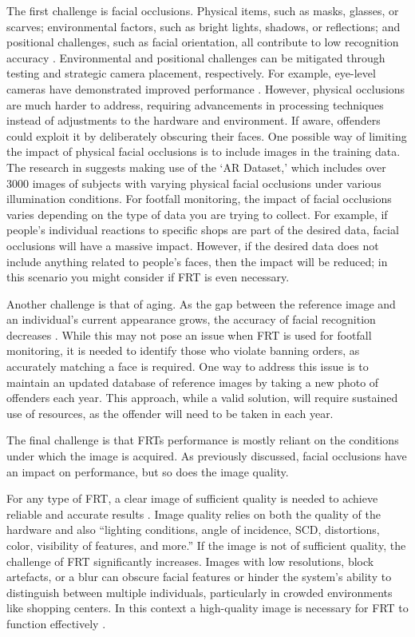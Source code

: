 \documentclass{article}
\begin{document}
The first challenge is facial occlusions. Physical items, such as masks, glasses, or scarves; environmental factors, such as bright lights, shadows, or reflections; and positional challenges, such as facial orientation, all contribute to low recognition accuracy \cite{PPFOfFRT}. Environmental and positional challenges can be mitigated through testing and strategic camera placement, respectively. For example, eye-level cameras have demonstrated improved performance \cite{Bacci2021}. However, physical occlusions are much harder to address, requiring advancements in processing techniques instead of adjustments to the hardware and environment. If aware, offenders could exploit it by deliberately obscuring their faces. One possible way of limiting the impact of physical facial occlusions is to include images in the training data. The research in \cite{PPFOfFRT} suggests making use of the ‘AR Dataset,’ which includes over 3000 images of subjects with varying physical facial occlusions under various illumination conditions. For footfall monitoring, the impact of facial occlusions varies depending on the type of data you are trying to collect. For example, if people's individual reactions to specific shops are part of the desired data, facial occlusions will have a massive impact. However, if the desired data does not include anything related to people's faces, then the impact will be reduced; in this scenario you might consider if FRT is even necessary.

Another challenge is that of aging. As the gap between the reference image and an individual's current appearance grows, the accuracy of facial recognition decreases \cite{PPFOfFRT}. While this may not pose an issue when FRT is used for footfall monitoring, it is needed to identify those who violate banning orders, as accurately matching a face is required. One way to address this issue is to maintain an updated database of reference images by taking a new photo of offenders each year. This approach, while a valid solution, will require sustained use of resources, as the offender will need to be taken in each year.

The final challenge is that FRTs performance is mostly reliant on the conditions under which the image is acquired. As previously discussed, facial occlusions have an impact on performance, but so does the image quality. 

For any type of FRT, a clear image of sufficient quality is needed to achieve reliable and accurate results \cite{Bacci2021}. Image quality relies on both the quality of the hardware and also “lighting conditions, angle of incidence, SCD, distortions, color, visibility of features, and more.” \cite{Bacci2021} If the image is not of sufficient quality, the challenge of FRT significantly increases. Images with low resolutions, block artefacts, or a blur can obscure facial features or hinder the system's ability to distinguish between multiple individuals, particularly in crowded environments like shopping centers. In this context a high-quality image is necessary for FRT to function effectively \cite{PPFOfFRT}. 
\end{document}
